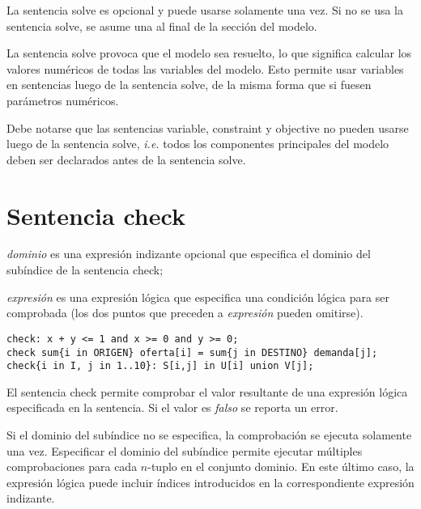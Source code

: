 \documentclass[11pt,spanish]{report}
\def\para#1{\noindent{\bf#1}}
\begin{document}
\noindent
\framebox[468pt][l]{
\parbox[c][24pt]{468pt}{
\hspace{6pt} {\tt solve} {\tt;}
}}

\medskip

La sentencia solve es opcional y puede usarse solamente una vez. Si no se usa la sentencia solve, se asume una al final de la sección del modelo.

La sentencia solve provoca que el modelo sea resuelto, lo que significa calcular los valores numéricos de todas las variables del modelo. Esto permite usar variables en sentencias luego de la sentencia solve, de la misma forma que si fuesen parámetros numéricos.

Debe notarse que las sentencias variable, constraint y objective no pueden usarse luego de la sentencia solve, {\it i.e.} todos los componentes principales del modelo deben ser declarados antes de la sentencia solve.

\section{Sentencia check}

\noindent
{}

\medskip

\noindent
{\it dominio} es una expresión indizante opcional que especifica el dominio del subíndice de la sentencia check;

\noindent
{\it expresión} es una expresión lógica que especifica una condición lógica para ser comprobada (los dos puntos que preceden a {\it expresión} pueden omitirse).

\para{Ejemplos}

\begin{verbatim}
check: x + y <= 1 and x >= 0 and y >= 0;
check sum{i in ORIGEN} oferta[i] = sum{j in DESTINO} demanda[j];
check{i in I, j in 1..10}: S[i,j] in U[i] union V[j];
\end{verbatim}

El sentencia check permite comprobar el valor resultante de una expresión lógica especificada en la sentencia. Si el valor es {\it falso} se reporta un error.

Si el dominio del subíndice no se especifica, la comprobación se ejecuta solamente una vez. Especificar el dominio del subíndice permite ejecutar múltiples comprobaciones para cada $n$-tuplo en el conjunto dominio. En este último caso, la expresión lógica puede incluir índices introducidos en la correspondiente expresión indizante.
\end{document}
